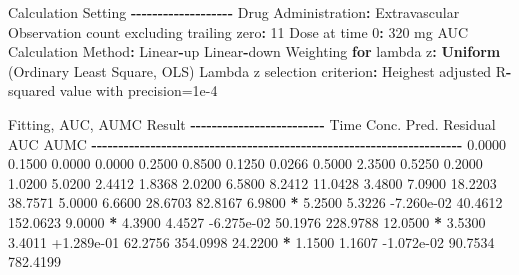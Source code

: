 \documentclass[
  12pt,
]{krantz}
\newenvironment{Shaded}{\begin{snugshade}}{\end{snugshade}}
\newcommand{\ControlFlowTok}[1]{\textcolor[rgb]{0.13,0.29,0.53}{\textbf{#1}}}
\newcommand{\DecValTok}[1]{\textcolor[rgb]{0.00,0.00,0.81}{#1}}
\newcommand{\FloatTok}[1]{\textcolor[rgb]{0.00,0.00,0.81}{#1}}
\newcommand{\KeywordTok}[1]{\textcolor[rgb]{0.13,0.29,0.53}{\textbf{#1}}}
\newcommand{\NormalTok}[1]{#1}
\newcommand{\OperatorTok}[1]{\textcolor[rgb]{0.81,0.36,0.00}{\textbf{#1}}}
\newcommand{\StringTok}[1]{\textcolor[rgb]{0.31,0.60,0.02}{#1}}
\begin{document}
\begin{Shaded}
\begin{Highlighting}[]
\NormalTok{Calculation Setting}
\OperatorTok{{-}{-}{-}{-}{-}{-}{-}{-}{-}{-}{-}{-}{-}{-}{-}{-}{-}{-}{-}}
\NormalTok{Drug Administration}\OperatorTok{:}\StringTok{ }\NormalTok{Extravascular}
\NormalTok{Observation count excluding trailing zero}\OperatorTok{:}\StringTok{ }\DecValTok{11}
\NormalTok{Dose at time }\DecValTok{0}\OperatorTok{:}\StringTok{ }\DecValTok{320}\NormalTok{ mg}
\NormalTok{AUC Calculation Method}\OperatorTok{:}\StringTok{ }\NormalTok{Linear}\OperatorTok{{-}}\NormalTok{up Linear}\OperatorTok{{-}}\NormalTok{down}
\NormalTok{Weighting }\ControlFlowTok{for}\NormalTok{ lambda z}\OperatorTok{:}\StringTok{ }\KeywordTok{Uniform}\NormalTok{ (Ordinary Least Square, OLS)}
\NormalTok{Lambda z selection criterion}\OperatorTok{:}\StringTok{ }\NormalTok{Heighest adjusted R}\OperatorTok{{-}}\NormalTok{squared value with precision=}\FloatTok{1e{-}4}


\NormalTok{Fitting, AUC, AUMC Result}
\OperatorTok{{-}{-}{-}{-}{-}{-}{-}{-}{-}{-}{-}{-}{-}{-}{-}{-}{-}{-}{-}{-}{-}{-}{-}{-}{-}}
\StringTok{      }\NormalTok{Time         Conc.      Pred.   Residual       AUC       AUMC}
\OperatorTok{{-}{-}{-}{-}{-}{-}{-}{-}{-}{-}{-}{-}{-}{-}{-}{-}{-}{-}{-}{-}{-}{-}{-}{-}{-}{-}{-}{-}{-}{-}{-}{-}{-}{-}{-}{-}{-}{-}{-}{-}{-}{-}{-}{-}{-}{-}{-}{-}{-}{-}{-}{-}{-}{-}{-}{-}{-}{-}{-}{-}{-}{-}{-}{-}{-}{-}{-}{-}{-}}
\StringTok{     }\FloatTok{0.0000}       \FloatTok{0.1500}                           \FloatTok{0.0000}     \FloatTok{0.0000}
     \FloatTok{0.2500}       \FloatTok{0.8500}                           \FloatTok{0.1250}     \FloatTok{0.0266}
     \FloatTok{0.5000}       \FloatTok{2.3500}                           \FloatTok{0.5250}     \FloatTok{0.2000}
     \FloatTok{1.0200}       \FloatTok{5.0200}                           \FloatTok{2.4412}     \FloatTok{1.8368}
     \FloatTok{2.0200}       \FloatTok{6.5800}                           \FloatTok{8.2412}    \FloatTok{11.0428}
     \FloatTok{3.4800}       \FloatTok{7.0900}                          \FloatTok{18.2203}    \FloatTok{38.7571}
     \FloatTok{5.0000}       \FloatTok{6.6600}                          \FloatTok{28.6703}    \FloatTok{82.8167}
     \FloatTok{6.9800} \OperatorTok{*}\StringTok{     }\FloatTok{5.2500}     \FloatTok{5.3226} \FloatTok{{-}7.260e{-}02}    \FloatTok{40.4612}   \FloatTok{152.0623}
     \FloatTok{9.0000} \OperatorTok{*}\StringTok{     }\FloatTok{4.3900}     \FloatTok{4.4527} \FloatTok{{-}6.275e{-}02}    \FloatTok{50.1976}   \FloatTok{228.9788}
    \FloatTok{12.0500} \OperatorTok{*}\StringTok{     }\FloatTok{3.5300}     \FloatTok{3.4011} \FloatTok{+1.289e{-}01}    \FloatTok{62.2756}   \FloatTok{354.0998}
    \FloatTok{24.2200} \OperatorTok{*}\StringTok{     }\FloatTok{1.1500}     \FloatTok{1.1607} \FloatTok{{-}1.072e{-}02}    \FloatTok{90.7534}   \FloatTok{782.4199}


\end{Highlighting}
\end{Shaded}
\end{document}
